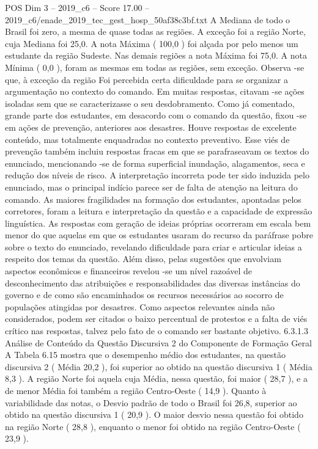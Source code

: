 \begin{textsample}{POS Dim 3 – 2019\_c6 – Score 17.00 – 2019\_c6/enade\_2019\_tec\_gest\_hosp\_50af38c3bf.txt}
A Mediana de todo o Brasil foi zero, a mesma de quase todas as regiões.
A exceção foi a região Norte, cuja Mediana foi 25,0.
A nota Máxima ( 100,0 ) foi alçada por pelo menos um estudante da região Sudeste.
Nas demais regiões a nota Máxima foi 75,0.
A nota Mínima ( 0,0 ), foram as mesmas em todas as regiões, sem exceção.
Observa -se que, à exceção da região Foi percebida certa dificuldade para se organizar a argumentação no contexto do comando.
Em muitas respostas, citavam -se ações isoladas sem que se caracterizasse o seu desdobramento.
Como já comentado, grande parte dos estudantes, em desacordo com o comando da questão, fixou -se em ações de prevenção, anteriores aos desastres.
Houve respostas de excelente conteúdo, mas totalmente enquadradas no contexto preventivo.
Esse viés de prevenção também incluiu respostas fracas em que se parafraseavam os textos do enunciado, mencionando -se de forma superficial inundação, alagamentos, seca e redução dos níveis de risco.
A interpretação incorreta pode ter sido induzida pelo enunciado, mas o principal indício parece ser de falta de atenção na leitura do comando.
As maiores fragilidades na formação dos estudantes, apontadas pelos corretores, foram a leitura e interpretação da questão e a capacidade de expressão linguística.
As respostas com geração de ideias próprias ocorreram em escala bem menor do que aquelas em que os estudantes usaram do recurso da paráfrase pobre sobre o texto do enunciado, revelando dificuldade para criar e articular ideias a respeito dos temas da questão.
Além disso, pelas sugestões que envolviam aspectos econômicos e financeiros revelou -se um nível razoável de desconhecimento das atribuições e responsabilidades das diversas instâncias do governo e de como são encaminhados os recursos necessários ao socorro de populações atingidas por desastres.
Como aspectos relevantes ainda não considerados, podem ser citados o baixo percentual de protestos e a falta de viés crítico nas respostas, talvez pelo fato de o comando ser bastante objetivo. 6.3.1.3 Análise de Conteúdo da Questão Discursiva 2 do Componente de Formação Geral A Tabela 6.15 mostra que o desempenho médio dos estudantes, na questão discursiva 2 ( Média 20,2 ), foi superior ao obtido na questão discursiva 1 ( Média 8,3 ).
A região Norte foi aquela cuja Média, nessa questão, foi maior ( 28,7 ), e a de menor Média foi também a região Centro-Oeste ( 14,9 ).
Quanto à variabilidade das notas, o Desvio padrão de todo o Brasil foi 26,8, superior ao obtido na questão discursiva 1 ( 20,9 ).
O maior desvio nessa questão foi obtido na região Norte ( 28,8 ), enquanto o menor foi obtido na região Centro-Oeste ( 23,9 ).

\end{textsample}
